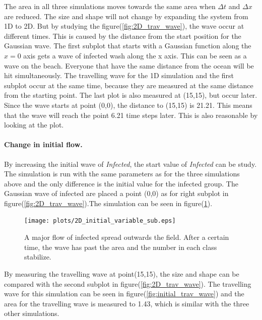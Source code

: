 \documentclass[%
twoside,                 %
final,                   %
10pt]{article}
\begin{document}
\noindent
The area in all three simulations moves towards the same area when $\Delta t$ and $\Delta x$ are reduced. The size and shape will not change by  expanding the system from 1D to 2D. But by studying the figure(\ref{fig:2D_trav_wave}), the wave occur at different times. This is caused by the distance from the start position for the Gaussian wave. The first subplot that starts with a Gaussian function along the $x=0$ axis gets a wave of infected wash along the x axis. This can be seen as a wave on the beach. Everyone that have the same distance from the ocean will be hit simultaneously. The travelling wave for the 1D simulation and the first subplot occur at the same time, because they are measured at the same distance from the starting point. The last plot is also measured at (15,15), but occur later. Since the wave starts at point (0,0), the distance to (15,15) is 21.21. This means that the wave will reach the point 6.21 time steps later. This is also reasonable by looking at the plot.    

\paragraph{Change in initial flow.}
By increasing the initial wave of \emph{Infected}, the start value of \emph{Infected} can be study. The simulation is run with the same parameters as for the three simulations above and the only difference is the initial value for the infected group. The Gaussian wave of infected are placed a point (0,0) as for right subplot in figure(\ref{fig:2D_trav_wave}).The simulation can be seen in figure(\ref{fig:initial_value}).  


\begin{figure}[ht]
  \centerline{\texttt{[image: plots/2D\_initial\_variable\_sub.eps]}}
  \caption{
  \label{fig:initial_value} A major flow of infected spread outwards the field. After a certain time, the wave has past the area and the number in each class stabilize.
  }
\end{figure}


By measuring the travelling wave at point(15,15), the size and shape can be compared with the second subplot in figure(\ref{fig:2D_trav_wave}). The travelling wave for this simulation can be seen in figure(\ref{fig:initial_trav_wave}) and the area for the travelling wave is measured to 1.43, which is similar with the three other simulations.
\end{document}
